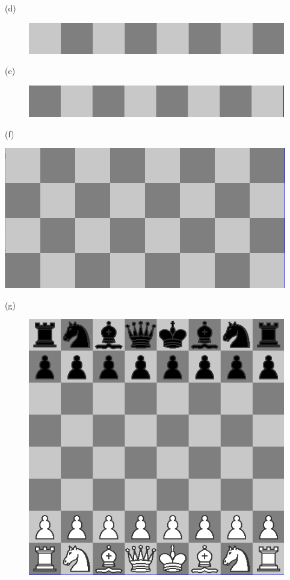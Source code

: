 \documentclass{article}
\begin{document}
\begin{itemize}
\begin{itemize}[leftmargin=2em]
			
			\subitem(d)
			\begin{figure}[ht]
				\centering
				\includegraphics[scale=2.5]{img/ejercicio_02_d}
				\caption{}
			\end{figure}
			
			\subitem(e)
			\begin{figure}[ht]
				\centering
				\includegraphics[scale=2.5]{img/ejercicio_02_e}
				\caption{}
			\end{figure}
			
			\subitem(f)
			
			
			\begin{minipage}{\linewidth}
				\centering
				\includegraphics[scale=2.9]{img/ejercicio_02_f}
			\end{minipage}
			
			\newpage
			\subitem(g)
			\begin{figure}[ht]
				\centering
				\includegraphics[scale=2.5]{img/ejercicio_02_g}
				\caption{}
			\end{figure}
			

\end{itemize}
\end{itemize}
\end{document}
